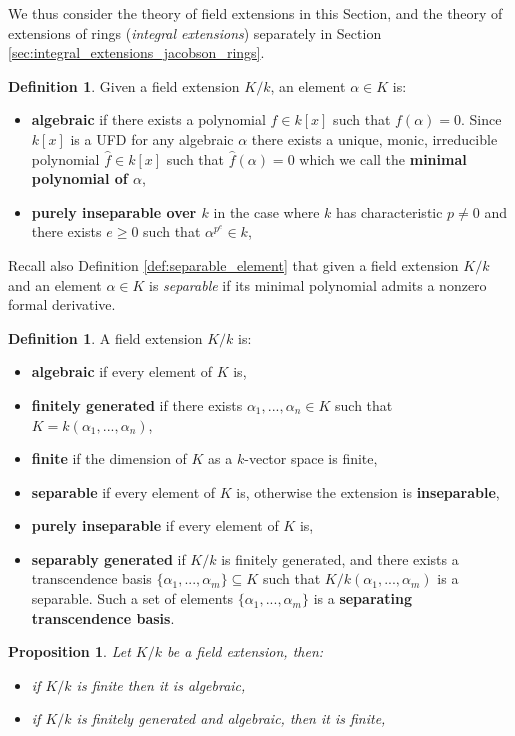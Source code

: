 \documentclass[12pt]{article}
\theoremstyle{plain}
\newtheorem{proposition}[thm]{Proposition}
\theoremstyle{definition}
\newtheorem{defn}[thm]{Definition} %
\begin{document}
We thus consider the theory of field extensions in this Section, and the theory of extensions of rings (\emph{integral extensions}) separately in Section \ref{sec:integral_extensions_jacobson_rings}.
\begin{defn}
Given a field extension $K/k$, an element $\alpha \in K$ is:
\begin{itemize}
    \item \textbf{algebraic} if there exists a polynomial $f \in k[x]$ such that $f(\alpha) = 0$. Since $k[x]$ is a UFD for any algebraic $\alpha$ there exists a unique, monic, irreducible polynomial $\hat{f} \in k[x]$ such that $\hat{f}(\alpha) = 0$ which we call the \textbf{minimal polynomial of $\alpha$},
    \item \textbf{purely inseparable over $k$} in the case where $k$ has characteristic $p \neq 0$ and there exists $e \geq 0$ such that $\alpha^{p^e} \in k$,
\end{itemize}
\end{defn}
Recall also Definition \ref{def:separable_element} that given a field extension $K/k$ and an element $\alpha \in K$ is \emph{separable} if its minimal polynomial admits a nonzero formal derivative.
\begin{defn}
A field extension $K/k$ is:
\begin{itemize}
    \item \textbf{algebraic} if every element of $K$ is,
    \item \textbf{finitely generated} if there exists $\alpha_1,...,\alpha_n \in K$ such that $K = k(\alpha_1,...,\alpha_n)$,
    \item \textbf{finite} if the dimension of $K$ as a $k$-vector space is finite,
    \item \textbf{separable} if every element of $K$ is, otherwise the extension is \textbf{inseparable},
    \item \textbf{purely inseparable} if every element of $K$ is,
    \item \textbf{separably generated} if $K/k$ is finitely generated, and there exists a transcendence basis $\lbrace \alpha_1,...,\alpha_m\rbrace \subseteq K$ such that $K/k(\alpha_1,...,\alpha_m)$ is a separable. Such a set of elements $\lbrace \alpha_1,...,\alpha_m\rbrace$ is a \textbf{separating transcendence basis}.
\end{itemize}
\end{defn}
\begin{proposition}\label{prop:extension_relations}
Let $K/k$ be a field extension, then:
\begin{itemize}
    \item if $K/k$ is finite then it is algebraic,
    \item if $K/k$ is finitely generated and algebraic, then it is finite,
\end{itemize}
\end{proposition}
\end{document}
